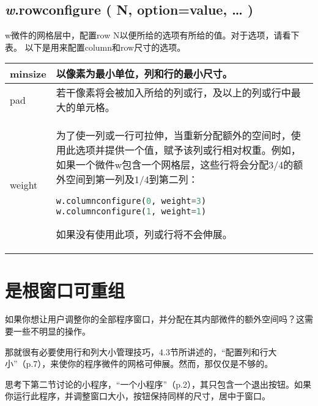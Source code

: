 \documentclass[11pt,a4paper,oneside]{book}
\begin{document}
\subsection*{\textsf{\textit{w}.rowconfigure ( N, option=value, … )}}
\par{w微件的网格层中，配置row N以便所给的选项有所给的值。对于选项，请看下表。}
\newline
\newline
以下是用来配置column和row尺寸的选项。\\
\begin{tabular}{|l|p{}|}
\hline
minsize&
以像素为最小单位，列和行的最小尺寸。\\ \hline
pad&
若干像素将会被加入所给的列或行，及以上的列或行中最大的单元格。\\ \hline
weight&
为了使一列或一行可拉伸，当重新分配额外的空间时，使用此选项并提供一个值，赋予该列或行相对权重。例如，如果一个微件w包含一个网格层，这些行将会分配3/4的额外空间到第一列及1/4到第二列：

\begin{lstlisting}[language=python]
w.columnconfigure(0, weight=3)
w.columnconfigure(1, weight=1)
\end{lstlisting}
如果没有使用此项，列或行将不会伸展。\\ \hline
\end{tabular}
\section[是根窗口可重组]{是根窗口可重组}%
如果你想让用户调整你的全部程序窗口，并分配在其内部微件的额外空间吗？这需要一些不明显的操作。

那就很有必要使用行和列大小管理技巧，4.3节所讲述的，“配置列和行大小”（p.7），来使你的程序微件的网格可伸展。然而，那仅仅是不够的。

思考下第二节讨论的小程序，“一个小程序”（p.2），其只包含一个退出按钮。如果你运行此程序，并调整窗口大小，按钮保持同样的尺寸，居中于窗口。
\end{document}
